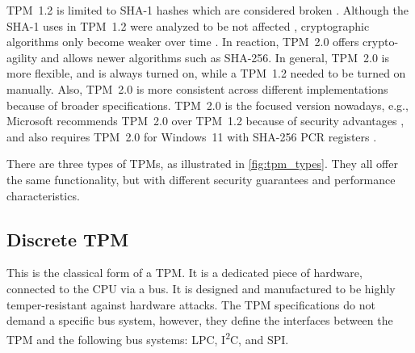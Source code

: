%


TPM~1.2 is limited to SHA-1 hashes which are considered broken \cite{cryptoeprint:2005/010, Wang2005, Stevens2017}. Although the SHA-1 uses in TPM~1.2 were analyzed to be not affected \cite{sha1tpm12}, cryptographic algorithms only become weaker over time \cite{Arthur2015}. In reaction, TPM~2.0 offers crypto-agility and allows newer algorithms such as SHA-256. In general, TPM~2.0 is more flexible, and is always turned on, while a TPM~1.2 needed to be turned on manually. Also, TPM~2.0 is more consistent across different implementations because of broader specifications.
TPM~2.0 is the focused version nowadays, e.g., Microsoft recommends TPM~2.0 over TPM~1.2 because of security advantages \cite{micrec}, and also requires TPM~2.0 for Windows~11 with SHA-256 PCR registers \cite{win11req}.




There are three types of TPMs, as illustrated in \autoref{fig:tpm_types}. They all offer the same functionality, but with different security guarantees and performance characteristics.



\subsection{Discrete TPM}

This is the classical form of a TPM. It is a dedicated piece of hardware, connected to the CPU via a bus. It is designed and manufactured to be highly temper-resistant against hardware attacks.
The TPM specifications \cite{tpm, tcgPcClient} do not demand a specific bus system, however, they define the interfaces between the TPM and the following bus systems: LPC, I\textsuperscript{2}C, and SPI.

